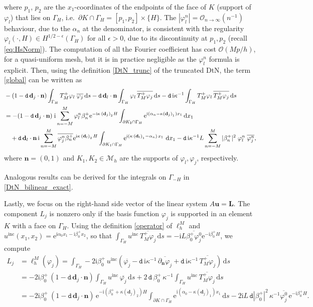 \documentclass[a4paper,10pt]{article}
\newcommand{\bd}{{\mathbf d}}
\newcommand{\bn}{{\mathbf n}}
\newcommand{\ri}{{\mathrm i}}
\newcommand{\re}{{\mathrm e}}
\newcommand{\rd}{{\,\mathrm d}}
\newcommand{\inc}{{\mathrm{inc}}}
\newcommand{\Mh}{{\mathcal M_h}}
\newcommand{\pd}{{\mathtt{d}}}
\newcommand{\GH}{{\Gamma_H}}
\newcommand{\GmH}{{\Gamma_{-H}}}
\begin{document}
where $p_1$, $p_2$ are the $x_1$-coordinates of the endpoints of the face of $K$ (support of $\varphi_l$) that lies on $\GH$, i.e.\ $\partial K\cap\GH=[p_1,p_2]\times \{H\}$.
The $|\varphi_l^n|=\mathcal O_{n\to\infty}(n^{-1})$ behaviour, due to the $\alpha_n$ at the denominator, is consistent with the regularity $\varphi_l(\cdot,H)\in H^{1/2-\epsilon}(\GH)$ for all $\epsilon>0$, due to its discontinuity at $p_1,p_2$ (recall \eqref{eq:HsNorm}).
The computation of all the Fourier coefficient has cost $\mathcal O(Mp/h)$, for a quasi-uniform mesh, but it is in practice negligible as the $\varphi_l^n$ formula is explicit.
Then, using the definition \eqref{DtN_trunc} of the truncated DtN, the term \eqref{global} can be written as
\begin{align*}
&-( 1 - \pd \, \bd_j \cdot \bn) \int_\GH T_M^+ \varphi_l \;  \overline{\varphi_j} \rd s 
- \pd \, \bd_l \cdot \bn \int_\GH \varphi_l \, \overline{T_M^+ \varphi_j} \rd s
- \pd \, \ri\kappa^{-1} \int_\GH T_M^+ \varphi_l \, \overline{T_M^+ \varphi_j} \rd s
\\
&=-( 1 - \pd \, \bd_j \cdot \bn) 
\;\ri \sum_{n=-M}^M \varphi_l^n \beta_n^+ \re^{-\ri\kappa \, (\bd_j)_{_2} H} \int_{\partial K_2\cap\GH} 
\re^{\ri(\alpha_n-\kappa (\bd_j)_{_1}) x_1}  \rd x_1
\\
&\quad + \pd \, \bd_l \cdot \bn 
\,\ri \sum_{n=-M}^M \overline{\varphi_j^n \beta_n^+} \re^{\ri\kappa \, (\bd_l)_{_2}\hspace{0.03cm} H} 
\int_{\partial K_1\cap\GH} \re^{\ri(\kappa \,(\bd_l)_{_1}-\alpha_n) \, x_1} \, \rd x_1
- \pd \, \ri\kappa^{-1}L\sum_{n=-M}^M   | \beta_n^+ |^2\;\varphi_l^n\; \overline{\varphi_j^n},
\end{align*}
where $\bn=(0,1)$ and $K_1,K_2\in\Mh$ are the supports of $\varphi_l,\varphi_j$, respectively.

Analogous results can be derived for the integrals on $\GmH$ in \eqref{DtN_bilinear_exact}.

Lastly, we focus on the right-hand side vector of the linear system $A\mathbf u=\mathbf L$.
The component $L_j$ is nonzero only if the basis function $\varphi_j$ is supported in an element $K$ with a face on $\GH$. 
Using the definition \eqref{operator} of $\ell_h^M$ and 
$u^\inc (x_1,x_2)=\re^{\ri\alpha_0 x_1 - \ri \beta_0^+ x_2}$, so that 
$\int_\GH u^\inc \, \overline{T_M^+ \varphi_j}\rd s 
=-\ri L\overline{\beta_0^+\varphi_j^0}\re^{-\ri\beta_0^+H}$,
we compute
\begin{align*}
L_j &= \ell^M_h(\varphi_j) 
=  \int_\GH - 2\ri\beta_0^+ \, u^\inc \left( \overline{\varphi_j} -\pd \, \ri\kappa^{-1} \, \overline{\partial_\bn \varphi_j} + \pd \, \ri\kappa^{-1} \, \overline{T_M^+ \varphi_j} \right) \rd s \\ 
& =  -2\ri\beta_0^+ \, (1 - \pd \, \bd_j \cdot \bn ) \int_\GH u^\inc \, \overline{\varphi_j} \rd s
+2 \, \pd \,\beta_0^+ \, \kappa^{-1} \int_\GH u^\inc \, \overline{T_M^+ \varphi_j} \rd s
\\
&= -2\ri\beta_0^+ \ (1 - \pd \, \bd_j \cdot \bn )\, \re^{-\ri(\beta_0^++\kappa(\bd_j)_2)H} 
\int_{\partial K\cap\GH} \re^{\ri(\alpha_0-\kappa(\bd_j)_1)x_1}\rd s
- 2 \ri L\, \pd |\beta_0^+|^2 \, \kappa^{-1}\overline{\varphi_j^0}\,\re^{-\ri\beta_0^+H}.
\end{align*}
\end{document}

